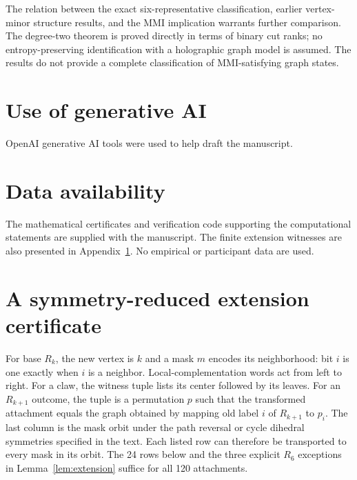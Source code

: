 \documentclass[11pt,letterpaper]{article}
\begin{document}
The relation between the exact six-representative classification, earlier vertex-minor structure results, and the MMI implication warrants further comparison. The degree-two theorem is proved directly in terms of binary cut ranks; no entropy-preserving identification with a holographic graph model is assumed. The results do not provide a complete classification of MMI-satisfying graph states.

\section*{Use of generative AI}
OpenAI generative AI tools were used to help draft the manuscript.

\section*{Data availability}
The mathematical certificates and verification code supporting the computational statements are supplied with the manuscript. The finite extension witnesses are also presented in Appendix~\ref{app:extensions}. No empirical or participant data are used.

\appendix
\section{A symmetry-reduced extension certificate}\label{app:extensions}
For base $R_k$, the new vertex is $k$ and a mask $m$ encodes its neighborhood: bit $i$ is one exactly when $i$ is a neighbor. Local-complementation words act from left to right. For a claw, the witness tuple lists its center followed by its leaves. For an $R_{k+1}$ outcome, the tuple is a permutation $p$ such that the transformed attachment equals the graph obtained by mapping old label $i$ of $R_{k+1}$ to $p_i$. The last column is the mask orbit under the path reversal or cycle dihedral symmetries specified in the text. Each listed row can therefore be transported to every mask in its orbit. The 24 rows below and the three explicit $R_6$ exceptions in Lemma~\ref{lem:extension} suffice for all 120 attachments.
\end{document}
